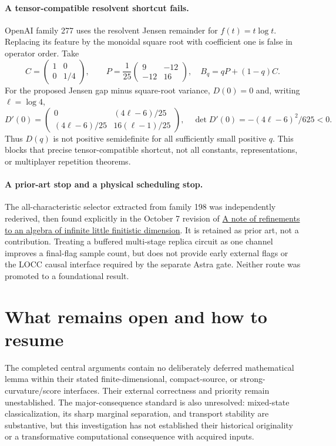 \documentclass[11pt]{article}
\begin{document}
\paragraph{A tensor-compatible resolvent shortcut fails.}
OpenAI family 277 uses the resolvent Jensen remainder for $f(t)=t\log t$. Replacing its feature by the monoidal square root with coefficient one is false in operator order. Take
\[
C=\begin{pmatrix}1&0\\0&1/4\end{pmatrix},\qquad
P=\frac1{25}\begin{pmatrix}9&-12\\-12&16\end{pmatrix},\quad B_q=qP+(1-q)C.
\]
For the proposed Jensen gap minus square-root variance, $D(0)=0$ and, writing $\ell=\log4$,
\[
D'(0)=\begin{pmatrix}0&(4\ell-6)/25\\(4\ell-6)/25&16(\ell-1)/25\end{pmatrix},
\quad\det D'(0)=-(4\ell-6)^2/625<0.
\]
Thus $D(q)$ is not positive semidefinite for all sufficiently small positive $q$. This blocks that precise tensor-compatible shortcut, not all constants, representations, or multiplayer repetition theorems.

\paragraph{A prior-art stop and a physical scheduling stop.}
The all-characteristic selector extracted from family 198 was independently rederived, then found explicitly in the October 7 revision of \href{https://hexagonmath.org/2610.00140v1}{A note of refinements to an algebra of infinite little finitistic dimension}. It is retained as prior art, not a contribution. Treating a buffered multi-stage replica circuit as one channel improves a final-flag sample count, but does not provide early external flags or the LOCC causal interface required by the separate Astra gate. Neither route was promoted to a foundational result.

\section{What remains open and how to resume}

The completed central arguments contain no deliberately deferred mathematical lemma within their stated finite-dimensional, compact-source, or strong-curvature/score interfaces. Their external correctness and priority remain unestablished. The major-consequence standard is also unresolved: mixed-state classicalization, its sharp marginal separation, and transport stability are substantive, but this investigation has not established their historical originality or a transformative computational consequence with acquired inputs.
\end{document}
